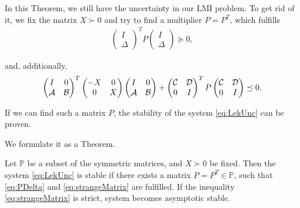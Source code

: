 In this Theorem, we still have the uncertainty in our LMI problem. 
To get rid of it, we fix the matrix $X\succ 0$ and try to find a multiplier $P = P^T$, which fulfills 
\begin{align}
	\label{eq:PDelta}
	\begin{pmatrix}
		I \\ \Delta
	\end{pmatrix}^T 
	P
	\begin{pmatrix}
		I \\ \Delta
	\end{pmatrix} \succeq 0,
\end{align}

and, additionally,
	\begin{align}
	\label{eq:strangeMatrix}
	\begin{pmatrix}
		I & 0 \\ \mathcal{A} &  \mathcal{B}
	\end{pmatrix}^T\begin{pmatrix}
		-X & 0 \\ 0 & X
	\end{pmatrix} 
	\begin{pmatrix}
		I & 0 \\ \mathcal{A} &  \mathcal{B}
	\end{pmatrix} + 
	\begin{pmatrix}
		\mathcal{C} & \mathcal{D} \\ 0 & I
	\end{pmatrix}^T
	P
	\begin{pmatrix}
		\mathcal{C} & \mathcal{D} \\ 0 & I
	\end{pmatrix} \preceq 0.
\end{align}

If we can find such a matrix $P$, the stability of the system \eqref{eq:LekUnc} can be proven. 

We formulate it as a Theorem. 

\begin{theo}
	\label{thm:stabViaP}
	Let $\mathbb{P}$ be a subset of the symmetric matrices, and $X \succ 0 $ be fixed.
	Then the system \eqref{eq:LekUnc} is stable if there exists a matrix $P = P^T \in \mathbb{P}$, such that \eqref{eq:PDelta} and \eqref{eq:strangeMatrix} are fulfilled. 
	If the inequality \eqref{eq:strangeMatrix} is strict, system becomes asymptotic stable. 
\end{theo}

